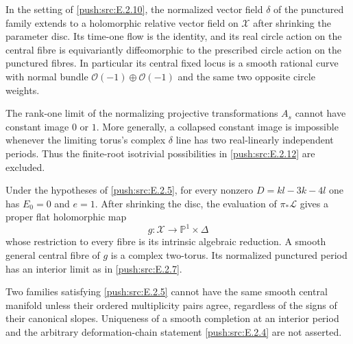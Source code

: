 
\begin{proposition}\hypertarget{tag-032Z}{}\label{push:src:E.2.14}


In the setting of \ref{push:src:E.2.10}, the normalized vector field
$\delta$ of the punctured family extends to a holomorphic
relative vector field on $\mathcal X$ after shrinking
the parameter disc.  Its time-one flow is the identity,
and its real circle action on the central fibre is
equivariantly diffeomorphic to the prescribed circle
action on the punctured fibres.  In particular its
central fixed locus is a smooth rational curve with
normal bundle $\mathcal O(-1)\oplus\mathcal O(-1)$
and the same two opposite circle weights.

The rank-one limit of the normalizing projective
transformations $A_s$ cannot have constant image
$0$ or $1$.  More generally, a collapsed constant
image is impossible whenever the limiting torus's
complex $\delta$ line has two real-linearly
independent periods.  Thus the finite-root
isotrivial possibilities in \ref{push:src:E.2.12} are excluded.
\end{proposition}

\begin{proposition}\hypertarget{tag-032V}{}\label{push:src:E.2.10}


Under the hypotheses of \ref{push:src:E.2.5}, for every nonzero
$D=kl-3k-4l$ one has $E_0=0$ and $e=1$.
After shrinking the disc, the evaluation of
$\pi_*\mathcal L$ gives a proper flat holomorphic map
\[
 g:\mathcal X\longrightarrow\mathbb P^1\times\Delta
\]
whose restriction to every fibre is its intrinsic algebraic
reduction.  A smooth general central fibre of $g$ is a
complex two-torus.  Its normalized punctured period has
an interior limit as in \ref{push:src:E.2.7}.

Two families satisfying \ref{push:src:E.2.5} cannot have the same smooth
central manifold unless their ordered multiplicity pairs
agree, regardless of the signs of their canonical slopes.
Uniqueness of a smooth completion at an interior period and
the arbitrary deformation-chain statement \ref{push:src:E.2.4} are not
asserted.
\end{proposition}

